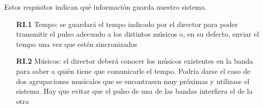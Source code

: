 Estos requisitos indican qué información guarda nuestro sistema.\\

  \begin{itemize}
    \item[\textbf{RI.1}] Tempo: se guardará el tempo indicado por el director
    para poder transmitir el pulso adecuado a los distintos músicos o, en su defecto,
    enviar el tempo una vez que estén sincronizados
    \item[\textbf{RI.2}] Músicos: el director deberá conocer los músicos existentes en la banda
    para saber a quién tiene que comunicarle el tempo. Podría darse el caso de dos
    agrupaciones musicales que se encontrasen muy próximas y utilizase el sistema.
    Hay que evitar que el pulso de una de las bandas interfiera el de la otra
  \end{itemize}
